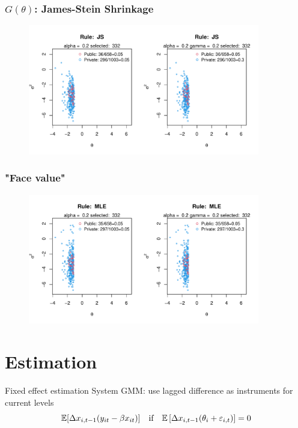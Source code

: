 \documentclass[10pt,mathserif,aspectratio=169]{beamer}
\begin{document}
\begin{frame}
  \frametitle{$G(\theta)$: James-Stein Shrinkage }
  \begin{figure}
    \centering
    \includegraphics[width=0.9\textwidth]{../../Figures/2013-2022/GMM_m/GLmix/Left_0.2_0.2_JS.pdf}
  \end{figure}
\end{frame}

\begin{frame}
  \frametitle{"Face value"}
  \begin{figure}
    \centering
    \includegraphics[width=0.9\textwidth]{../../Figures/2013-2022/GMM_m/GLmix/Left_0.2_0.2_MLE.pdf}
  \end{figure}
\end{frame}

\section{Estimation}
\begin{frame}{Fixed effect estimation}
  System GMM: use lagged difference as instruments for current levels
  \begin{equation*}
    \mathbb{E}[\Delta x_{i,t-1}(y_{it}-\beta x_{it})] \quad \text{if}\quad \mathbb{E}\left[\Delta x_{i,t-1}(\theta_i+\varepsilon_{i,t})\right]=0
  \end{equation*}
\end{frame}
\end{document}
